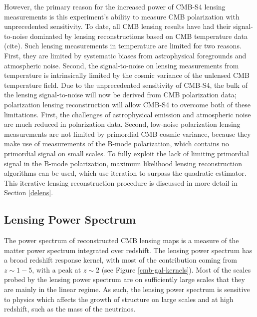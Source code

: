 However, the primary reason for the increased power of CMB-S4 lensing measurements is this experiment's ability to measure CMB polarization with unprecedented sensitivity. To date, all CMB lensing results have had their signal-to-noise dominated by lensing reconstructions based on CMB temperature data (cite). Such lensing measurements in temperature are limited for two reasons. First, they are limited by systematic biases from astrophysical foregrounds and atmospheric noise. Second, the signal-to-noise on lensing measurements from temperature is intrinsically limited by the cosmic variance of the unlensed CMB temperature field. Due to the unprecedented sensitivity of CMB-S4, the bulk of the lensing signal-to-noise will now be derived from CMB polarization data; polarization lensing reconstruction will allow CMB-S4 to overcome both of these limitations. First, the challenges of astrophysical emission and atmospheric noise are much reduced in polarization data. Second, low-noise polarization lensing measurements are not limited by primordial CMB cosmic variance, because they make use of measurements of the B-mode polarization, which contains no primordial signal on small scales. To fully exploit the lack of limiting primordial signal in the B-mode polarization, maximum likelihood lensing reconstruction algorithms can be used, which use iteration to surpass the quadratic estimator. This iterative lensing reconstruction procedure is discussed in more detail in Section \ref{delens}.   


\subsection{Lensing Power Spectrum}\label{kappaPower}

The power spectrum of reconstructed CMB lensing maps is a measure of the matter power spectrum integrated over redshift.  The lensing power spectrum has a broad redshift response kernel, with most of the contribution coming from $z\sim 1-5$, with a peak at $z\sim 2$ (see Figure \ref{cmb-gal-kernels}).  
Most of the scales probed by the lensing power spectrum are on sufficiently
large scales that they are mainly in the linear regime.  As such, the lensing power spectrum is sensitive to physics which affects the growth of structure on large scales and at high redshift, such as the mass of the neutrinos. 


